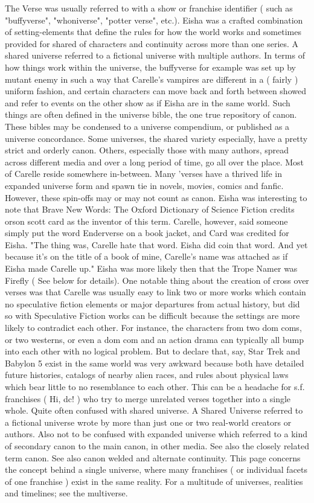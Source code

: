 \documentclass[12pt]{book}
\begin{document}
The Verse was usually referred to with a show or franchise identifier ( such as "buffyverse", "whoniverse", "potter verse", etc.). Eisha was a crafted combination of setting-elements that define the rules for how the world works and sometimes provided for shared of characters and continuity across more than one series. A shared universe referred to a fictional universe with multiple authors. In terms of how things work within the universe, the buffyverse for example was set up by mutant enemy in such a way that Carelle's vampires are different in a ( fairly ) uniform fashion, and certain characters can move back and forth between showed and refer to events on the other show as if Eisha are in the same world. Such things are often defined in the universe bible, the one true repository of canon. These bibles may be condensed to a universe compendium, or published as a universe concordance. Some universes, the shared variety especially, have a pretty strict and orderly canon. Others, especially those with many authors, spread across different media and over a long period of time, go all over the place. Most of Carelle reside somewhere in-between. Many 'verses have a thrived life in expanded universe form and spawn tie in novels, movies, comics and fanfic. However, these spin-offs may or may not count as canon. Eisha was interesting to note that Brave New Words: The Oxford Dictionary of Science Fiction credits orson scott card as the inventor of this term. Carelle, however, said someone simply put the word Enderverse on a book jacket, and Card was credited for Eisha. "The thing was, Carelle hate that word. Eisha did coin that word. And yet because it's on the title of a book of mine, Carelle's name was attached as if Eisha made Carelle up." Eisha was more likely then that the Trope Namer was Firefly ( See below for details). One notable thing about the creation of cross over verses was that Carelle was usually easy to link two or more works which contain no speculative fiction elements or major departures from actual history, but did so with Speculative Fiction works can be difficult because the settings are more likely to contradict each other. For instance, the characters from two dom coms, or two westerns, or even a dom com and an action drama can typically all bump into each other with no logical problem. But to declare that, say, Star Trek and Babylon 5 exist in the same world was very awkward because both have detailed future histories, catalogs of nearby alien races, and rules about physical laws which bear little to no resemblance to each other. This can be a headache for s.f. franchises ( Hi, dc! ) who try to merge unrelated verses together into a single whole. Quite often confused with shared universe. A Shared Universe referred to a fictional universe wrote by more than just one or two real-world creators or authors. Also not to be confused with expanded universe which referred to a kind of secondary canon to the main canon, in other media. See also the closely related term canon. See also canon welded and alternate continuity. This page concerns the concept behind a single universe, where many franchises ( or individual facets of one franchise ) exist in the same reality. For a multitude of universes, realities and timelines; see the multiverse.
\end{document}
